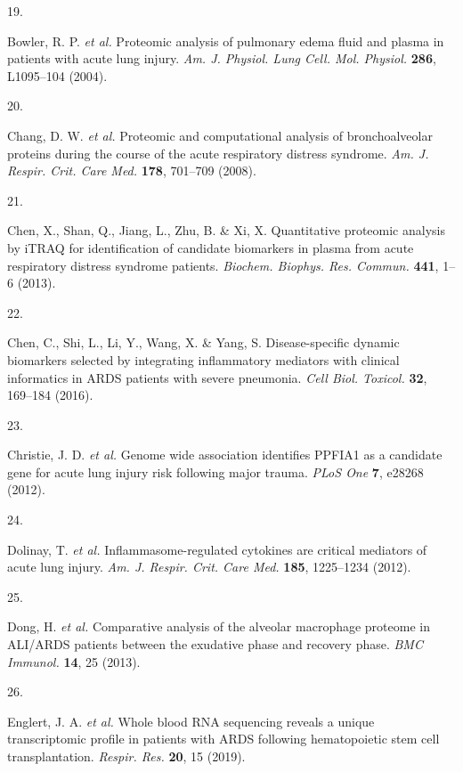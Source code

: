 \documentclass[
  11,
  a4paper,
]{article}
\newlength{\cslhangindent}
\newlength{\csllabelwidth}
\newlength{\cslentryspacingunit} %
\newenvironment{CSLReferences}[2] %
 {%
  \setlength{\parindent}{0pt}
  \ifodd #1
  \let\oldpar\par
  \def\par{\hangindent=\cslhangindent\oldpar}
  \fi
  \setlength{\parskip}{#2\cslentryspacingunit}
 }%
 {}
\newcommand{\CSLLeftMargin}[1]{\parbox[t]{\csllabelwidth}{#1}}
\newcommand{\CSLRightInline}[1]{\parbox[t]{\linewidth - \csllabelwidth}{#1}\break}
\begin{document}
\begin{CSLReferences}{0}{0}
\leavevmode{}%
\CSLLeftMargin{19. }%
\CSLRightInline{Bowler, R. P. \emph{et al.} Proteomic analysis of
pulmonary edema fluid and plasma in patients with acute lung injury.
\emph{Am. J. Physiol. Lung Cell. Mol. Physiol.} \textbf{286}, L1095--104
(2004).}

\leavevmode{}%
\CSLLeftMargin{20. }%
\CSLRightInline{Chang, D. W. \emph{et al.} Proteomic and computational
analysis of bronchoalveolar proteins during the course of the acute
respiratory distress syndrome. \emph{Am. J. Respir. Crit. Care Med.}
\textbf{178}, 701--709 (2008).}

\leavevmode{}%
\CSLLeftMargin{21. }%
\CSLRightInline{Chen, X., Shan, Q., Jiang, L., Zhu, B. \& Xi, X.
Quantitative proteomic analysis by {iTRAQ} for identification of
candidate biomarkers in plasma from acute respiratory distress syndrome
patients. \emph{Biochem. Biophys. Res. Commun.} \textbf{441}, 1--6
(2013).}

\leavevmode{}%
\CSLLeftMargin{22. }%
\CSLRightInline{Chen, C., Shi, L., Li, Y., Wang, X. \& Yang, S.
Disease-specific dynamic biomarkers selected by integrating inflammatory
mediators with clinical informatics in {ARDS} patients with severe
pneumonia. \emph{Cell Biol. Toxicol.} \textbf{32}, 169--184 (2016).}

\leavevmode{}%
\CSLLeftMargin{23. }%
\CSLRightInline{Christie, J. D. \emph{et al.} Genome wide association
identifies {PPFIA1} as a candidate gene for acute lung injury risk
following major trauma. \emph{PLoS One} \textbf{7}, e28268 (2012).}

\leavevmode{}%
\CSLLeftMargin{24. }%
\CSLRightInline{Dolinay, T. \emph{et al.} Inflammasome-regulated
cytokines are critical mediators of acute lung injury. \emph{Am. J.
Respir. Crit. Care Med.} \textbf{185}, 1225--1234 (2012).}

\leavevmode{}%
\CSLLeftMargin{25. }%
\CSLRightInline{Dong, H. \emph{et al.} Comparative analysis of the
alveolar macrophage proteome in {ALI/ARDS} patients between the
exudative phase and recovery phase. \emph{BMC Immunol.} \textbf{14}, 25
(2013).}

\leavevmode{}%
\CSLLeftMargin{26. }%
\CSLRightInline{Englert, J. A. \emph{et al.} Whole blood {RNA}
sequencing reveals a unique transcriptomic profile in patients with
{ARDS} following hematopoietic stem cell transplantation. \emph{Respir.
Res.} \textbf{20}, 15 (2019).}


\end{CSLReferences}
\end{document}
